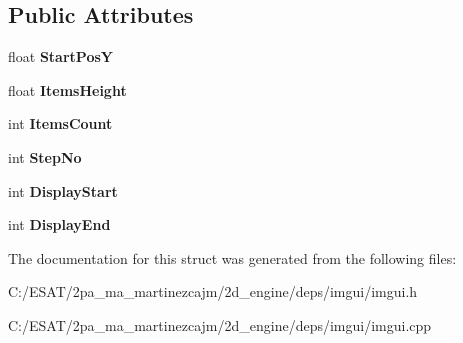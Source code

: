 \subsection*{Public Attributes}
\begin{DoxyCompactItemize}
\item 
\mbox{\label{struct_im_gui_list_clipper_affee91b338520cd4bd59b5b680dcb5ae}} 
float {\bfseries Start\+PosY}
\item 
\mbox{\label{struct_im_gui_list_clipper_a19762cb78ff0adccb414027c25678a60}} 
float {\bfseries Items\+Height}
\item 
\mbox{\label{struct_im_gui_list_clipper_a4e2b4e8efe10615d04ad2aeea467f522}} 
int {\bfseries Items\+Count}
\item 
\mbox{\label{struct_im_gui_list_clipper_a8fe78f0368e16425c33fd35ca45d1912}} 
int {\bfseries Step\+No}
\item 
\mbox{\label{struct_im_gui_list_clipper_a9d096e06e5633fd77a8a209c00fe454a}} 
int {\bfseries Display\+Start}
\item 
\mbox{\label{struct_im_gui_list_clipper_aa49e30d04ad8f8b95fbaa62dfbb4ea3e}} 
int {\bfseries Display\+End}
\end{DoxyCompactItemize}


The documentation for this struct was generated from the following files\+:\begin{DoxyCompactItemize}
\item 
C\+:/\+E\+S\+A\+T/2pa\+\_\+ma\+\_\+martinezcajm/2d\+\_\+engine/deps/imgui/imgui.\+h\item 
C\+:/\+E\+S\+A\+T/2pa\+\_\+ma\+\_\+martinezcajm/2d\+\_\+engine/deps/imgui/imgui.\+cpp\end{DoxyCompactItemize}
